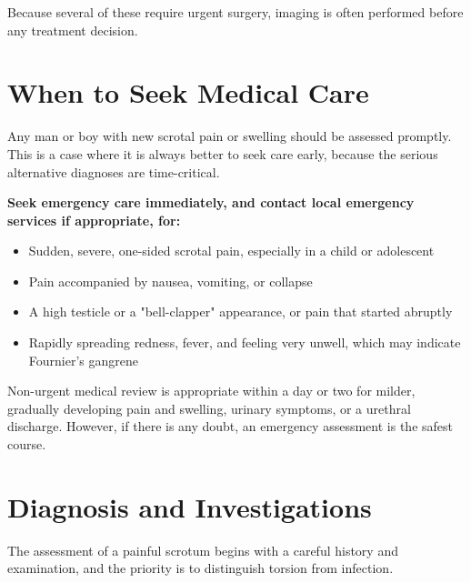Because several of these require urgent surgery, imaging is often performed before any treatment decision.

\section*{When to Seek Medical Care}
Any man or boy with new scrotal pain or swelling should be assessed promptly. This is a case where it is always better to seek care early, because the serious alternative diagnoses are time-critical.

\textbf{Seek emergency care immediately, and contact local emergency services if appropriate, for:}
\begin{itemize}
    \item Sudden, severe, one-sided scrotal pain, especially in a child or adolescent
    \item Pain accompanied by nausea, vomiting, or collapse
    \item A high testicle or a "bell-clapper" appearance, or pain that started abruptly
    \item Rapidly spreading redness, fever, and feeling very unwell, which may indicate Fournier's gangrene
\end{itemize}

Non-urgent medical review is appropriate within a day or two for milder, gradually developing pain and swelling, urinary symptoms, or a urethral discharge. However, if there is any doubt, an emergency assessment is the safest course.

\section*{Diagnosis and Investigations}
The assessment of a painful scrotum begins with a careful history and examination, and the priority is to distinguish torsion from infection.

